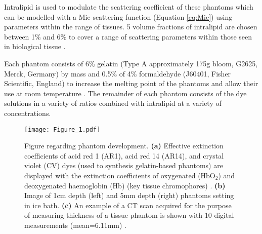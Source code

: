 Intralipid is used to modulate the scattering coefficient of these phantoms which can be modelled with a Mie scattering function (Equation \eqref{eq:Mie}) using parameters within the range of tissues. 5 volume fractions of intralipid are chosen between 1\% and 6\% to cover a range of scattering parameters within those seen in biological tissue \cite{Jacques2013}. 

Each phantom consists of 6\% gelatin (Type A approximately 175g bloom, G2625, Merck, Germany) by mass %
and 0.5\% of 4\% formaldehyde (J60401, Fisher Scientific, England) to increase the melting point of the phantoms and allow their use at room temperature \cite{Pogue2006}. The remainder of each phantom consists of the dye solutions in a variety of ratios combined with intralipid at a variety of concentrations. 

\begin{figure}[htb]
    \centering%
    \texttt{[image: Figure\_1.pdf]}
    \caption{Figure regarding phantom development. 
    \textbf{(a)}
    Effective extinction coefficients of acid red 1 (AR1), acid red 14 (AR14), and crystal violet (CV) dyes 
    (used to synthesis gelatin-based phantoms)
    are displayed with the extinction coefficients of oxygenated (HbO$_2$) and deoxygenated haemoglobin (Hb) 
    (key tissue chromophores)
    .
    \textbf{(b)}
    Image of 1cm depth (left) and 5mm depth (right) phantoms setting in ice bath.
    \textbf{(c)}
    An example of a CT scan acquired for the purpose of measuring thickness of a tissue phantom is shown with
    10 digital measurements (mean=6.11mm)%
    .}
    \label{fig:phantommethods}%
\end{figure}

